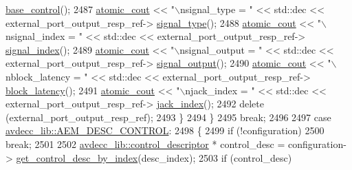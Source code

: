 \begin{DoxyCode}
      \hyperlink{classavdecc__lib_1_1external__port__output__descriptor__response_ac1f5297533142234c764e84c01ce5a16}{base\_control}();
2487             \hyperlink{cmd__line_8h_a0bc38ccc65c79ba06c6fcd7b4bf554c3}{atomic\_cout} << \textcolor{stringliteral}{"\(\backslash\)nsignal\_type = "} << std::dec << external\_port\_output\_resp\_ref->
      \hyperlink{classavdecc__lib_1_1external__port__output__descriptor__response_ac204637e5ecfc30b4cc47c0d78d81ce1}{signal\_type}();
2488             \hyperlink{cmd__line_8h_a0bc38ccc65c79ba06c6fcd7b4bf554c3}{atomic\_cout} << \textcolor{stringliteral}{"\(\backslash\)nsignal\_index = "} << std::dec << external\_port\_output\_resp\_ref->
      \hyperlink{classavdecc__lib_1_1external__port__output__descriptor__response_aa1d83268f9a492f864d3e213acf71a97}{signal\_index}();
2489             \hyperlink{cmd__line_8h_a0bc38ccc65c79ba06c6fcd7b4bf554c3}{atomic\_cout} << \textcolor{stringliteral}{"\(\backslash\)nsignal\_output = "} << std::dec << external\_port\_output\_resp\_ref->
      \hyperlink{classavdecc__lib_1_1external__port__output__descriptor__response_a729bc59f434e7de353db02db35977dfa}{signal\_output}();
2490             \hyperlink{cmd__line_8h_a0bc38ccc65c79ba06c6fcd7b4bf554c3}{atomic\_cout} << \textcolor{stringliteral}{"\(\backslash\)nblock\_latency = "} << std::dec << external\_port\_output\_resp\_ref->
      \hyperlink{classavdecc__lib_1_1external__port__output__descriptor__response_af1eddc3de0237a6db00b74603eba47c6}{block\_latency}();
2491             \hyperlink{cmd__line_8h_a0bc38ccc65c79ba06c6fcd7b4bf554c3}{atomic\_cout} << \textcolor{stringliteral}{"\(\backslash\)njack\_index = "} << std::dec << external\_port\_output\_resp\_ref->
      \hyperlink{classavdecc__lib_1_1external__port__output__descriptor__response_aa4a1215ca41fe8d5d8bdd66a5742e93c}{jack\_index}();
2492             \textcolor{keyword}{delete} (external\_port\_output\_resp\_ref);
2493         \}
2494     \}
2495     \textcolor{keywordflow}{break};
2496 
2497     \textcolor{keywordflow}{case} \hyperlink{namespaceavdecc__lib_ac7b7d227e46bc72b63ee9e9aae15902fa200b40ee880b3e8c19f1a3f300ecb038}{avdecc\_lib::AEM\_DESC\_CONTROL}:
2498     \{
2499         \textcolor{keywordflow}{if} (!configuration)
2500             \textcolor{keywordflow}{break};
2501 
2502         \hyperlink{classavdecc__lib_1_1control__descriptor}{avdecc\_lib::control\_descriptor} * control\_desc = configuration->
      \hyperlink{classavdecc__lib_1_1configuration__descriptor_a970929f76405008ad7c5116ba3b71ca7}{get\_control\_desc\_by\_index}(desc\_index);
2503         \textcolor{keywordflow}{if} (control\_desc)

\end{DoxyCode}

